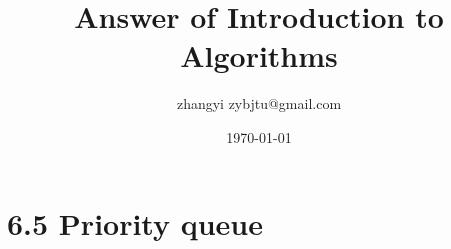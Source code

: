 \documentclass[10pt, a4paper]{ctexart}
\title{Answer of Introduction to Algorithms}
\date{\today}
\author{zhangyi zybjtu@gmail.com}
\begin{document}
      
    \maketitle  
    \section{6.5 Priority queue}
        
       
\end{document}
